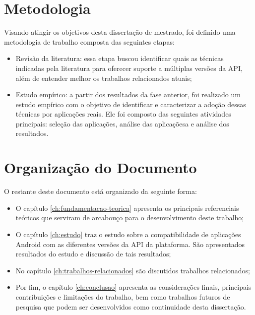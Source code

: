 \section{Metodologia} \label{sec:metodologia}

Visando atingir os objetivos desta dissertação de mestrado, foi definido uma
metodologia de trabalho composta das seguintes etapas:
\begin{itemize}
	\item Revisão da literatura: essa etapa buscou identificar quais as técnicas
	indicadas pela literatura para oferecer suporte a múltiplas versões da API,
	além de entender melhor os trabalhos relacionados atuais;
	\item Estudo empírico: a partir dos resultados da fase anterior, foi realizado
	um estudo empírico com o objetivo de identificar e caracterizar a adoção dessas
	técnicas por aplicações reais. Ele foi composto das seguintes atividades principais:
	seleção das aplicações, análise das aplicaçõesa e análise dos resultados.
\end{itemize}


\section{Organização do Documento} \label{sec:organizacao-trabalho}

O restante deste documento está organizado da seguinte forma:
\begin{itemize}
    \item O capítulo \ref{ch:fundamentacao-teorica} apresenta os principais
    referenciais teóricos que serviram de arcabouço para o desenvolvimento
    deste trabalho;
    \item O capítulo \ref{ch:estudo}  traz o estudo sobre a compatibilidade
    de aplicações Android com as diferentes versões da API da plataforma. São
    apresentados resultados do estudo e discussão de tais resultados;
    \item No capítulo \ref{ch:trabalhos-relacionados} são discutidos trabalhos
    relacionados;
    \item Por fim, o capítulo \ref{ch:conclusao} apresenta as considerações finais,
    principais contribuições e limitações do trabalho, bem como trabalhos futuros
    de pesquisa que podem ser desenvolvidos como continuidade desta dissertação.
\end{itemize}
